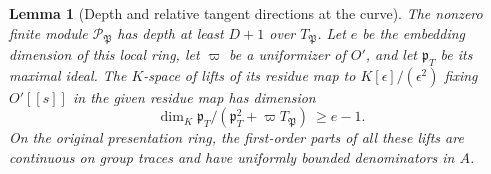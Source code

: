 \documentclass[a4paper,11pt]{article}
\newtheorem{lemma}[proposition]{Lemma}
\theoremstyle{definition}
\theoremstyle{remark}
\numberwithin{equation}{section}
\begin{document}
\begin{lemma}[Depth and relative tangent directions at the curve]\leavevmode
\label{lem:parameterdepth409}
The nonzero finite module \(\mathcal P_{\mathfrak P}\) has
depth at least \(D+1\) over \(T_{\mathfrak P}\). Let \(e\)
be the embedding dimension of this local ring, let
\(\varpi\) be a uniformizer of \(O'\), and let \(\mathfrak p_T\)
be its maximal ideal. The \(K\)-space of lifts of its residue
map to \(K[\epsilon]/(\epsilon^2)\) fixing \(O'[[s]]\)
in the given residue map has dimension
\[
              \dim_K\mathfrak p_T/
                        (\mathfrak p_T^2+\varpi T_{\mathfrak P})
                        \ \ge e-1 .
\]
On the original presentation ring, the first-order parts
of all these lifts are continuous on group traces and have
uniformly bounded denominators in \(A\).
\end{lemma}
\end{document}
